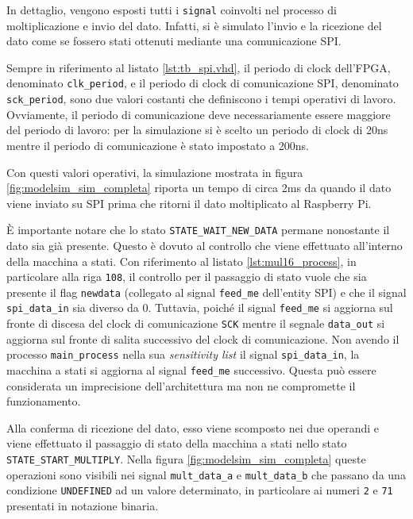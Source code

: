\documentclass[titlepage]{report}
\begin{document}
		In dettaglio, vengono esposti tutti i \texttt{signal} coinvolti nel processo di moltiplicazione e invio del dato. Infatti, si è simulato l'invio e la ricezione del dato come se fossero stati ottenuti mediante una comunicazione SPI.

		Sempre in riferimento al listato \ref*{lst:tb_spi.vhd}, il periodo di clock dell'FPGA, denominato \texttt{clk\_period}, e il periodo di clock di comunicazione SPI, denominato \texttt{sck\_period}, sono due valori costanti che definiscono i tempi operativi di lavoro. Ovviamente, il periodo di comunicazione deve necessariamente essere maggiore del periodo di lavoro: per la simulazione si è scelto un periodo di clock di 20ns mentre il periodo di comunicazione è stato impostato a 200ns.

		Con questi valori operativi, la simulazione mostrata in figura \ref{fig:modelsim_sim_completa} riporta un tempo di circa 2ms da quando il dato viene inviato su SPI prima che ritorni il dato moltiplicato al Raspberry Pi.

		È importante notare che lo stato \texttt{STATE\_WAIT\_NEW\_DATA} permane nonostante il dato sia già presente. Questo è dovuto al controllo che viene effettuato all'interno della macchina a stati. Con riferimento al listato \ref*{lst:mul16_process}, in particolare alla riga \texttt{108}, il controllo per il passaggio di stato vuole che sia presente il flag \texttt{newdata} (collegato al signal \texttt{feed\_me} dell'entity SPI) e che il signal \texttt{spi\_data\_in} sia diverso da 0.  Tuttavia, poiché il signal \texttt{feed\_me} si aggiorna sul fronte di discesa del clock di comunicazione \texttt{SCK} mentre il segnale \texttt{data\_out} si aggiorna sul fronte di salita successivo del clock di comunicazione. Non avendo il processo \texttt{main\_process} nella sua \textit{sensitivity list} il signal \texttt{spi\_data\_in}, la macchina a stati si aggiorna al signal \texttt{feed\_me} successivo.
		Questa può essere considerata un imprecisione dell'architettura ma non ne compromette il funzionamento.

		Alla conferma di ricezione del dato, esso viene scomposto nei due operandi e viene effettuato il passaggio di stato della macchina a stati nello stato \texttt{STATE\_START\_MULTIPLY}. Nella figura \ref{fig:modelsim_sim_completa} queste operazioni sono visibili nei signal \texttt{mult\_data\_a} e \texttt{mult\_data\_b} che passano da una condizione \texttt{UNDEFINED} ad un valore determinato, in particolare ai numeri \texttt{2} e \texttt{71} presentati in notazione binaria.
\end{document}
